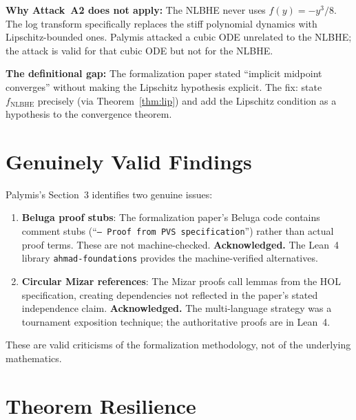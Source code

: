 \documentclass[11pt,letterpaper]{article}
\begin{document}
\textbf{Why Attack~A2 does not apply:} The NLBHE never uses $f(y) = -y^3/8$. The log
transform specifically replaces the stiff polynomial dynamics with Lipschitz-bounded ones.
Palymis attacked a cubic ODE unrelated to the NLBHE; the attack is valid for that cubic
ODE but not for the NLBHE.

\textbf{The definitional gap:} The formalization paper stated ``implicit midpoint converges''
without making the Lipschitz hypothesis explicit. The fix: state $f_{\mathrm{NLBHE}}$
precisely (via Theorem~\ref{thm:lip}) and add the Lipschitz condition as a hypothesis to the
convergence theorem.

\section{Genuinely Valid Findings}
\label{sec:valid}

Palymis's Section~3 identifies two genuine issues:

\begin{enumerate}[label=(\arabic*)]
\item \textbf{Beluga proof stubs}: The formalization paper's Beluga code contains comment
stubs (``\texttt{-- Proof from PVS specification}'') rather than actual proof terms. These
are not machine-checked. \textbf{Acknowledged.} The Lean~4 library
\texttt{ahmad-foundations} provides the machine-verified alternatives.

\item \textbf{Circular Mizar references}: The Mizar proofs call lemmas from the HOL
specification, creating dependencies not reflected in the paper's stated independence
claim. \textbf{Acknowledged.} The multi-language strategy was a tournament exposition
technique; the authoritative proofs are in Lean~4.
\end{enumerate}

These are valid criticisms of the formalization methodology, not of the underlying mathematics.

\section{Theorem Resilience}
\label{sec:resilience}
\end{document}
